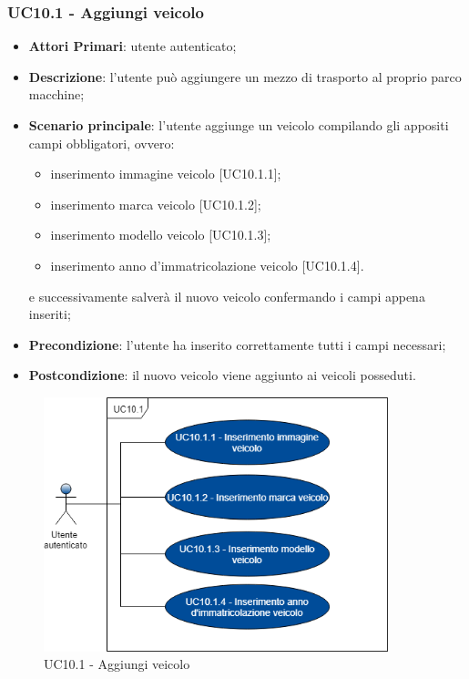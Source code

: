  \subsubsection{UC10.1 - Aggiungi veicolo}
 \begin{itemize}
 	\item \textbf{Attori Primari}: utente autenticato;
 	\item \textbf{Descrizione}: l'utente può aggiungere un mezzo di trasporto al proprio parco macchine;
 	\item \textbf{Scenario principale}: l'utente aggiunge un veicolo compilando gli appositi campi obbligatori, ovvero:
 	\begin{itemize}
 		\item inserimento immagine veicolo [UC10.1.1];
 		\item inserimento marca veicolo [UC10.1.2];
 		\item inserimento modello veicolo [UC10.1.3];
 		\item inserimento anno d'immatricolazione veicolo [UC10.1.4].
 	\end{itemize}
 	e successivamente salverà il nuovo veicolo confermando i campi appena inseriti;
 	\item \textbf{Precondizione}: l'utente ha inserito correttamente tutti i campi necessari;
 	\item \textbf{Postcondizione}: il nuovo veicolo viene aggiunto ai veicoli posseduti.
 \end{itemize}
\begin{figure}[H]
	\includegraphics[width=10cm]{res/images/UC10-1Aggiungiveicolo.png}
	\centering
	\caption{UC10.1 - Aggiungi veicolo}
\end{figure}
